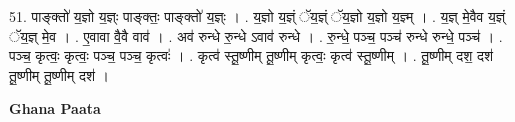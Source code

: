 \documentclass[17pt]{extarticle}
\begin{document}
51. पाङ्क्तो॑ य॒ज्ञो य॒ज्ञ्ः पाङ्क्तः॒ पाङ्क्तो॑ य॒ज्ञ्ः । . य॒ज्ञो य॒ज्ञ्ं ॅय॒ज्ञ्ं ॅय॒ज्ञो य॒ज्ञो य॒ज्ञ्म् । . य॒ज्ञ् मे॒वैव य॒ज्ञ्ं ॅय॒ज्ञ् मे॒व । . ए॒वावा वै॒वै वाव॑ । . अव॑ रुन्धे रु॒न्धे ऽवाव॑ रुन्धे । . रु॒न्धे॒ पञ्च॒ पञ्च॑ रुन्धे रुन्धे॒ पञ्च॑ । . पञ्च॒ कृत्वः॒ कृत्वः॒ पञ्च॒ पञ्च॒ कृत्वः॑ । . कृत्व॑ स्तू॒ष्णीम् तू॒ष्णीम् कृत्वः॒ कृत्व॑ स्तू॒ष्णीम् । . तू॒ष्णीम् दश॒ दश॑ तू॒ष्णीम् तू॒ष्णीम् दश॑ । \newline

\textbf{Ghana Paata } \newline
\end{document}
